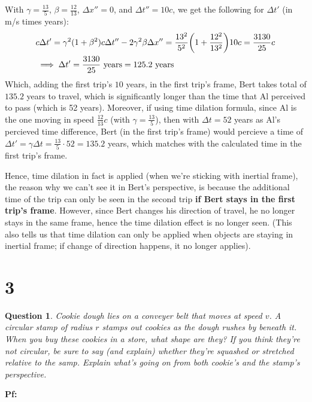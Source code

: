 \documentclass{article}
\newtheorem{question}{Question}
\DeclarePairedDelimiter{\paran}{(}{)}%
\begin{document}
With $\gamma = \frac{13}{5}$, $\beta = \frac{12}{13}$, $\Delta x''=0$, and $\Delta t''=10c$, we get the following for $\Delta t'$ (in m/s times years):
\begin{align}
    &c\Delta t' = \gamma^2(1+\beta^2)c\Delta t'' - 2\gamma^2\beta \Delta x'' = \frac{13^2}{5^2}\paran*{1+\frac{12^2}{13^2}}10c = \frac{3130}{25}c\\
    &\implies \Delta t' = \frac{3130}{25}\textmd{ years} = 125.2 \textmd{ years}
\end{align}
Which, adding the first trip's $10$ years, in the first trip's frame, Bert takes total of $135.2$ years to travel, which is significantly longer than the time that Al perceived to pass (which is 52 years). Moreover, if using time dilation formula, since Al is the one moving in speed $\frac{12}{13}c$ (with $\gamma = \frac{13}{5}$), then with $\Delta t=52$ years as Al's percieved time difference, Bert (in the first trip's frame) would percieve a time of $\Delta t' = \gamma \Delta t = \frac{13}{5}\cdot 52 = 135.2$ years, which matches with the calculated time in the first trip's frame.

Hence, time dilation in fact is applied (when we're sticking with inertial frame), the reason why we can't see it in Bert's perspective, is because the additional time of the trip can only be seen in the second trip \textbf{if Bert stays in the first trip's frame}. However, since Bert changes his direction of travel, he no longer stays in the same frame, hence the time dilation effect is no longer seen. (This also tells us that time dilation can only be applied when objects are staying in inertial frame; if change of direction happens, it no longer applies).

\break

\section*{3}
\begin{question}\label{q3}
    Cookie dough lies on a conveyer belt that moves at speed $v$. A circular stamp of radius $r$ stamps out cookies as the dough rushes by beneath it. When you buy these cookies in a store, what shape are they? If you think they're not circular, be sure to say (and explain) whether they're squashed or stretched relative to the samp. Explain what's going on from both cookie's and the stamp's perspective.
\end{question}

\textbf{Pf:}
\end{document}
